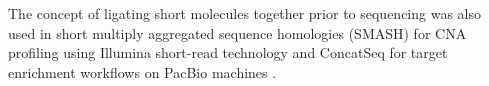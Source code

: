 The concept of ligating short molecules together prior to sequencing was
also used in short multiply aggregated sequence homologies (SMASH) for
CNA profiling using Illumina short-read technology \citep{wang2016smash}
and ConcatSeq for target enrichment workflows on PacBio machines
\citep{schlecht2017concatseq}.
